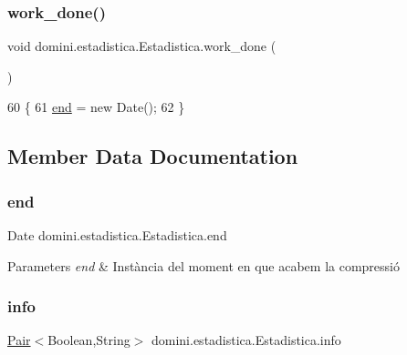 \subsubsection{\texorpdfstring{work\+\_\+done()}{work\_done()}}
{\footnotesize\ttfamily void domini.\+estadistica.\+Estadistica.\+work\+\_\+done (\begin{DoxyParamCaption}{ }\end{DoxyParamCaption})\hspace{0.3cm}{\ttfamily [inline]}}


\begin{DoxyCode}
60                             \{
61         \hyperlink{classdomini_1_1estadistica_1_1Estadistica_ae99e664f0569e308009ec7ca32864006}{end} = \textcolor{keyword}{new} Date();
62     \} 
\end{DoxyCode}


\subsection{Member Data Documentation}
\mbox{\label{classdomini_1_1estadistica_1_1Estadistica_ae99e664f0569e308009ec7ca32864006}} 
\subsubsection{\texorpdfstring{end}{end}}
{\footnotesize\ttfamily Date domini.\+estadistica.\+Estadistica.\+end\hspace{0.3cm}{\ttfamily [private]}}


\begin{DoxyParams}{Parameters}
{\em end} & Instància del moment en que acabem la compressió \\
\hline
\end{DoxyParams}
\mbox{\label{classdomini_1_1estadistica_1_1Estadistica_a57776a71683b3717b638377073b8a99e}} 
\subsubsection{\texorpdfstring{info}{info}}
{\footnotesize\ttfamily \hyperlink{classdomini_1_1utils_1_1Pair}{Pair}$<$Boolean,String$>$ domini.\+estadistica.\+Estadistica.\+info\hspace{0.3cm}{\ttfamily [private]}}



